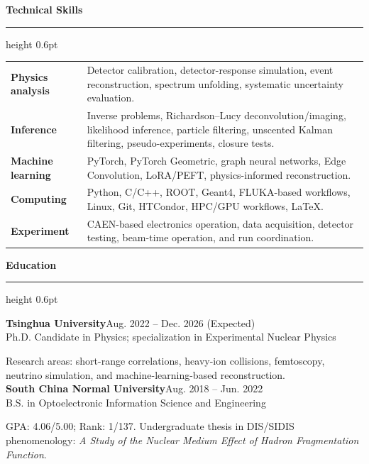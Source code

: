 \documentclass[10pt]{article}
\newcommand{\cvsection}[1]{%
  \vspace{0.75em}
  {\large\bfseries\color{accent} #1}\par
  \vspace{0.2em}
  {\color{rule}\hrule height 0.6pt}
  \vspace{0.45em}
}
\newcommand{\entry}[3]{%
  \textbf{#1}\hfill{\color{muted}#2}\\
  {\color{muted}#3}\par
}
\begin{document}
\cvsection{Technical Skills}
\begin{tabularx}{\linewidth}{@{}lX@{}}
\textbf{Physics analysis} & Detector calibration, detector-response simulation, event reconstruction, spectrum unfolding, systematic uncertainty evaluation.\\
\textbf{Inference} & Inverse problems, Richardson--Lucy deconvolution/imaging, likelihood inference, particle filtering, unscented Kalman filtering, pseudo-experiments, closure tests.\\
\textbf{Machine learning} & PyTorch, PyTorch Geometric, graph neural networks, Edge Convolution, LoRA/PEFT, physics-informed reconstruction.\\
\textbf{Computing} & Python, C/C++, ROOT, Geant4, FLUKA-based workflows, Linux, Git, HTCondor, HPC/GPU workflows, LaTeX.\\
\textbf{Experiment} & CAEN-based electronics operation, data acquisition, detector testing, beam-time operation, and run coordination.\\
\end{tabularx}

\newpage
\cvsection{Education}
\entry{Tsinghua University}{Aug. 2022 -- Dec. 2026 (Expected)}{Ph.D. Candidate in Physics; specialization in Experimental Nuclear Physics}
Research areas: short-range correlations, heavy-ion collisions, femtoscopy, neutrino simulation, and machine-learning-based reconstruction.\\[0.25em]
\entry{South China Normal University}{Aug. 2018 -- Jun. 2022}{B.S. in Optoelectronic Information Science and Engineering}
GPA: 4.06/5.00; Rank: 1/137. Undergraduate thesis in DIS/SIDIS phenomenology: \textit{A Study of the Nuclear Medium Effect of Hadron Fragmentation Function}.
\end{document}
